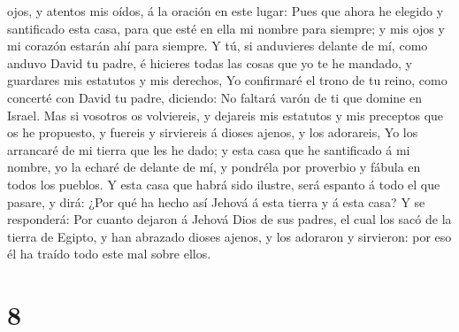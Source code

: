 ojos, y atentos mis oídos, á la oración en este lugar: 
Pues que ahora he elegido y santificado esta casa, para que esté en ella
mi nombre para siempre; y mis ojos y mi corazón estarán ahí para
siempre.  Y tú, si anduvieres delante de mí, como anduvo
David tu padre, é hicieres todas las cosas que yo te he mandado, y
guardares mis estatutos y mis derechos,  Yo confirmaré el
trono de tu reino, como concerté con David tu padre, diciendo: No
faltará varón de ti que domine en Israel.  Mas si vosotros
os volviereis, y dejareis mis estatutos y mis preceptos que os he
propuesto, y fuereis y sirviereis á dioses ajenos, y los adorareis,
 Yo los arrancaré de mi tierra que les he dado; y esta casa
que he santificado á mi nombre, yo la echaré de delante de mí, y
pondréla por proverbio y fábula en todos los pueblos.  Y
esta casa que habrá sido ilustre, será espanto á todo el que pasare, y
dirá: ¿Por qué ha hecho así Jehová á esta tierra y á esta casa?
 Y se responderá: Por cuanto dejaron á Jehová Dios de sus
padres, el cual los sacó de la tierra de Egipto, y han abrazado dioses
ajenos, y los adoraron y sirvieron: por eso él ha traído todo este mal
sobre ellos.

\hypertarget{section-7}{%
\section{8}\label{section-7}}

